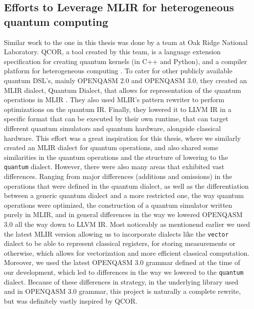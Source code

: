 \subsection{Efforts to Leverage MLIR for heterogeneous quantum computing}
Similar work to the one in this thesis was done by a team at Oak Ridge National Laboratory.
QCOR, a tool created by this team, is a language extension specification for creating quantum kernels (in C++ and Python),
and a compiler platform for heterogeneous computing \cite{qcor-cpp}\cite{qcor-python}.
To cater for other publicly available quantum DSL's, mainly OPENQASM 2.0 and OPENQASM 3.0, they created an 
MLIR dialect, Quantum Dialect, that allows for representation of the quantum operations in MLIR \cite{qcor-openqasm}\cite{qcor-openqasm-3.0}.
They also used MLIR's pattern rewriter to perform optimizations on the quantum IR.
Finally, they lowered it to LLVM IR in a specific format that can be executed by their own runtime, 
that can target different quantum simulators and quantum hardware, alongside classical hardware.
This effort was a great inspiration for this thesis,
where we similarly created an MLIR dialect for quantum operations, and 
also shared some similarities in the quantum operations and the structure of lowering 
to the \texttt{quantum} dialect.
However, there were also many areas that exhibited vast differences.
Ranging from major differences (additions and omissions) in the operations that were defined in the quantum dialect, 
as well as the differentiation between a generic quantum dialect and 
a more restricted one, the way quantum operations were optimized, the construction 
of a quantum simulator written purely in MLIR, and in general differences in the way we lowered OPENQASM 3.0 all the way down to LLVM IR.
 Most noticeably as mentionend earlier we used the latest MLIR version allowing us to incorporate
dialects like the \texttt{vector} dialect to be able to represent classical registers, for storing measurements or 
otherwise, which allows for vectorization and more efficient classical computation.
Moreover, we used the latest OPENQASM 3.0 grammar defined at the time of our development, which led to 
differences in the way we lowered to the \texttt{quantum} dialect.
Because of these differences in strategy, in the underlying library used and in OPENQASM 3.0 grammar,
this project is naturally a complete rewrite, but was definitely vastly inspired by QCOR.